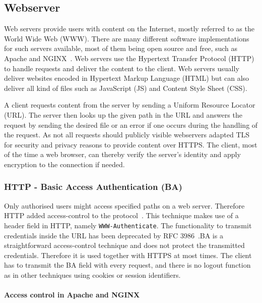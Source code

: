 \subsection{Webserver}

Web servers provide users with content on the Internet, mostly referred to as
the World Wide Web (WWW). There are many different software implementations for
such servers available, most of them being open source and free, such as Apache
and NGINX~. Web servers use the Hypertext
Transfer Protocol (HTTP) to handle requests and deliver the content to the
client. Web servers usually deliver websites encoded in Hypertext Markup
Language (HTML) but can also deliver all kind of files such as JavaScript (JS)
and Content Style Sheet (CSS).

A client requests content from the server by sending a Uniform Resource Locator
(URL). The server then looks up the given path in the URL and answers the
request by sending the desired file or an error if one occurs during the
handling of the request. As not all requests should publicly visible webservers
adapted TLS for security and privacy reasons to provide content over HTTPS. The
client, most of the time a web browser, can thereby verify the server's identity
and apply encryption to the connection if needed.

\subsubsection{HTTP - Basic Access Authentication (BA)}

Only authorised users might access specified paths on a web server. Therefore
HTTP added access-control to the protocol~. This
technique makes use of a header field in HTTP, namely \texttt{WWW-Authenticate}.
The functionality to transmit credentials inside the URL has been deprecated by
RFC 3986~.BA is a straightforward access-control
technique and does not protect the transmitted credentials. Therefore it is used
together with HTTPS at most times. The client has to transmit the BA field with
every request, and there is no logout function as in other techniques using
cookies or session identifiers.

\paragraph{Access control in Apache and NGINX}

